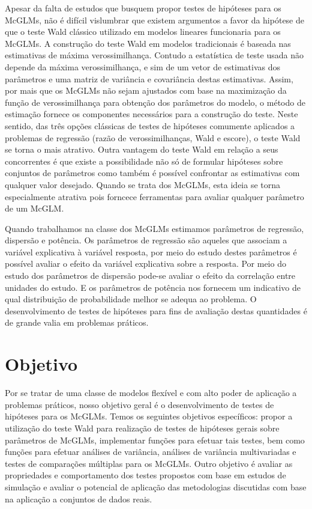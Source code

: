 Apesar da falta de estudos que busquem propor testes de hipóteses para os McGLMs, não é difícil vislumbrar que existem argumentos a favor da hipótese de que o teste Wald clássico utilizado em modelos lineares funcionaria para os McGLMs. A construção do teste Wald em modelos tradicionais é baseada nas estimativas de máxima verossimilhança. Contudo a estatística de teste usada não depende da máxima verossimilhança, e sim de um vetor de estimativas dos parâmetros e uma matriz de variância e covariância destas estimativas. Assim, por mais que os McGLMs não sejam ajustados com base na maximização da função de verossimilhança para obtenção dos parâmetros do modelo, o método de estimação fornece os componentes necessários para a construção do teste. Neste sentido, das três opções clássicas de testes de hipóteses comumente aplicados a problemas de regressão (razão de verossimilhanças, Wald e escore), o teste Wald se torna o mais atrativo. Outra vantagem do teste Wald em relação a seus concorrentes é que existe a possibilidade não só de formular hipóteses sobre conjuntos de parâmetros como também é possível confrontar as estimativas com qualquer valor desejado. Quando se trata dos McGLMs, esta ideia se torna especialmente atrativa pois forncece ferramentas para avaliar qualquer parâmetro de um McGLM. 

Quando trabalhamos na classe dos McGLMs estimamos parâmetros de regressão, dispersão e potência. Os parâmetros de regressão são aqueles que associam a variável explicativa à variável resposta, por meio do estudo destes parâmetros é possível avaliar o efeito da variável explicativa sobre a resposta. Por meio do estudo dos parâmetros de dispersão pode-se avaliar o efeito da correlação entre unidades do estudo. E os parâmetros de potência nos fornecem um indicativo de qual distribuição de probabilidade melhor se adequa ao problema. O desenvolvimento de testes de hipóteses para fins de avaliação destas quantidades é de grande valia em problemas práticos. 



\section{Objetivo}

Por se tratar de uma classe de modelos flexível e com alto poder de aplicação a problemas práticos, nosso objetivo geral é o desenvolvimento de testes de hipóteses para os McGLMs. Temos os seguintes objetivos específicos: propor a utilização do teste Wald para realização de testes de hipóteses gerais sobre parâmetros de McGLMs, implementar funções para efetuar tais testes, bem como funções para efetuar análises de variância, análises de variância multivariadas e testes de comparações múltiplas para os McGLMs. Outro objetivo é avaliar as propriedades e comportamento dos testes propostos com base em estudos de simulação e avaliar o potencial de aplicação das metodologias discutidas com base na aplicação a conjuntos de dados reais.

